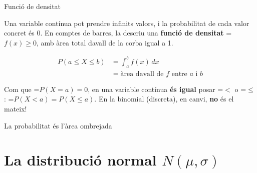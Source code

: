 \documentclass[11pt,a4paper]{article}
\newcommand{\lt}{<}\newcommand{\gt}{>}
\newcommand{\fmm}[1]{\setbox0=\hbox{$#1$}\ifdim\wd0>\linewidth\[#1\]\else\mbox{\box0}\fi}
\begin{document}
  

  
\begin{fmdef}{Funció de densitat}
\par\noindent \begin{minipage}[t]{0.48\linewidth}\vspace{0pt}\raggedright Una variable contínua pot prendre infinits valors, i la probabilitat de cada valor concret és 0. En comptes de barres, la descriu una \textbf{funció de densitat} \fmm{f(x)\geq0}, amb àrea total davall de la corba igual a 1.

          
\[\begin{aligned}P(a\leq X\leq b)&=\int_a^b f(x)\,dx\\&=\text{àrea davall de }f\text{ entre }a\text{ i }b\end{aligned}\]

          
\begin{fmnote}Com que \fmm{P(X=a)=0}, en una variable contínua \textbf{és igual} posar \fmm{\lt} o \fmm{\leq}: \fmm{P(X\lt a)=P(X\leq a)}. En la binomial (discreta), en canvi, \textbf{no} és el mateix!\end{fmnote}\end{minipage}\hfill\begin{minipage}[t]{0.48\linewidth}\vspace{0pt}\raggedright {\centering {}\par}{\centering\footnotesize La probabilitat és l'àrea ombrejada\par}\end{minipage}\par\medskip
\end{fmdef}

\section{La distribució normal $N(\mu,\sigma)$}\hypertarget{sec5}{}
\end{document}
